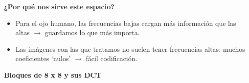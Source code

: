 \documentclass{beamer}
\begin{document}
\begin{frame}
    \textbf{¿Por qué nos sirve este espacio?}
    \begin{itemize}
        \item Para el ojo humano, las frecuencias bajas cargan más información que las altas $\rightarrow$ guardamos lo que más importa.
        \item Las imágenes con las que tratamos no suelen tener frecuencias altas: muchos coeficientes `nulos' $\rightarrow$ fácil codificación.
    \end{itemize}
\end{frame}

\begin{frame}


    \textbf{Bloques de 8 x 8 y sus DCT}


\end{frame}
\end{document}
